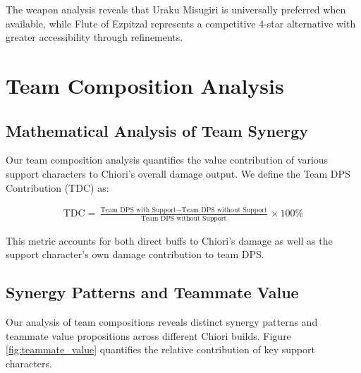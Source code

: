 \documentclass[12pt,a4paper]{article}
\begin{document}
The weapon analysis reveals that Uraku Misugiri is universally preferred when available, while Flute of Ezpitzal represents a competitive 4-star alternative with greater accessibility through refinements.

\section{Team Composition Analysis}

\subsection{Mathematical Analysis of Team Synergy}

Our team composition analysis quantifies the value contribution of various support characters to Chiori's overall damage output. We define the Team DPS Contribution (TDC) as:

\begin{align}
\text{TDC} = \frac{\text{Team DPS with Support} - \text{Team DPS without Support}}{\text{Team DPS without Support}} \times 100\%
\end{align}

This metric accounts for both direct buffs to Chiori's damage as well as the support character's own damage contribution to team DPS.

\subsection{Synergy Patterns and Teammate Value}

Our analysis of team compositions reveals distinct synergy patterns and teammate value propositions across different Chiori builds. Figure \ref{fig:teammate_value} quantifies the relative contribution of key support characters.
\end{document}
